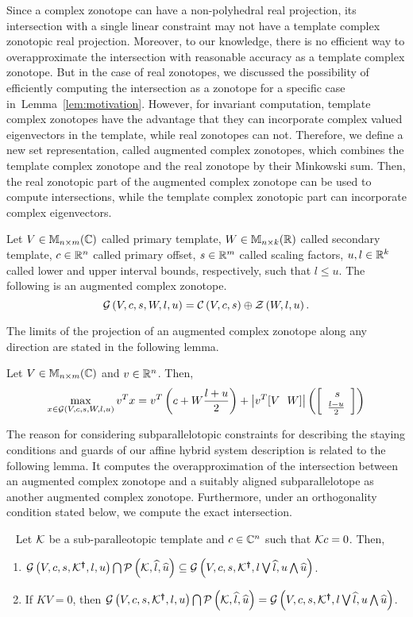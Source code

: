 Since a complex zonotope can have a non-polyhedral real projection,
its intersection with a single linear constraint may not have a
template complex zonotopic real projection.  Moreover, to our
knowledge, there is no efficient way to overapproximate the
intersection with reasonable accuracy as a template complex zonotope.
But in the case of real zonotopes, we discussed the possibility of
efficiently computing the intersection as a zonotope for a specific
case in~Lemma~\ref{lem:motivation}.  However, for invariant
computation, template complex zonotopes have the advantage that they
can incorporate complex valued eigenvectors in the template, while
real zonotopes can not.  Therefore, we define a new set
representation, called augmented complex zonotopes, which combines the
template complex zonotope and the real zonotope by their Minkowski
sum.  Then, the real zonotopic part of the augmented complex zonotope
can be used to compute intersections, while the template complex
zonotopic part can incorporate complex eigenvectors.
%
\begin{definition}
Let $V\in\mathbb{M}_{n\times m}(\mathbb{C})$ called primary template, $W\in\mathbb{M}_{n\times k}(\mathbb{R})$
called secondary template, $c\in\mathbb{R}^n$ called primary offset,
$s\in\mathbb{R}^m$ called scaling factors, $u,l\in\mathbb{R}^k$ called lower
and upper interval bounds, respectively, such that $l\leq u$.  The
following is an augmented complex
zonotope.
\begin{equation*}
\mathcal{G}\left(V,c,s,W,l,u\right) = \mathcal{C}\left(V,c,s\right)\oplus\mathcal{Z}\left(W,l,u\right).
\end{equation*}
\end{definition}
%
The limits of the projection of an augmented complex zonotope along
any direction are stated in the following lemma.
%
\begin{lemma}
Let $V\in\mathbb{M}_{n\times m}(\mathbb{\mathbb{C}})$ and $v\in\mathbb{R}^n$.  Then,
\[
\max_{x\in\mathcal{G}\left(V,c,s,W,l,u\right)}v^Tx = v^T\left(c+W\frac{l+u}{2}\right)+\left|v^T[V~~W]\right|\left(\left[\begin{array}{l}{~~s}\\{\frac{l-u}{2}} \end{array}\right]\right)
\]
\end{lemma}
%
The reason for considering subparallelotopic constraints for
describing the staying conditions and guards of our affine hybrid
system description is related to the following lemma.  It computes the
overapproximation of the intersection between an augmented complex
zonotope and a suitably aligned subparallelotope as another augmented
complex zonotope.  Furthermore, under an orthogonality condition
stated below, we compute the exact intersection.
%
\begin{lemma}~\label{lem:acz-int}
Let $\mathcal{K}$ be a sub-paralleotopic template and $c\in\mathbb{C}^n$
such that $\mathcal{K} c=0$.  Then,
\begin{enumerate}
\item
  $\mathcal{G}\left(V,c,s,\mathcal{K}^{\bm{\dagger}},l,u\right)\bigcap\mathcal{P}\left(\mathcal{K},\widehat{l},\widehat{u}\right)\subseteq
  \mathcal{G}\left(V,c,s,\mathcal{K}^{\bm{\dagger}},l\bigvee\widehat{l},u\bigwedge\widehat{u}\right)$.
\item If $KV=0$, then $\mathcal{G}\left(V,c,s,\mathcal{K}^{\bm{\dagger}},l,u\right)\bigcap\mathcal{P}\left(\mathcal{K},\widehat{l},\widehat{u}\right)=
  \mathcal{G}\left(V,c,s,\mathcal{K}^{\bm{\dagger}},l\bigvee\widehat{l},u\bigwedge\widehat{u}\right)$.
\end{enumerate}
\end{lemma}
